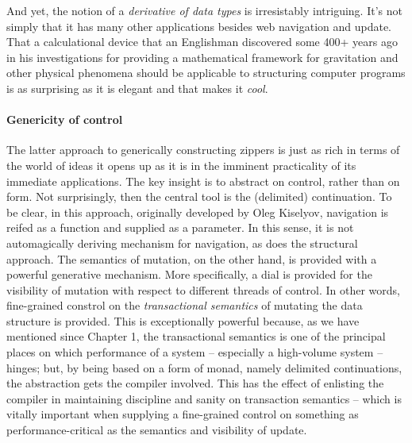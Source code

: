 And yet, the notion of a \emph{derivative of data types} is
irresistably intriguing. It's not simply that it has many other
applications besides web navigation and update. That a calculational
device that an Englishman discovered some 400+ years ago in his
investigations for providing a mathematical framework for gravitation
and other physical phenomena should be applicable to structuring
computer programs is as surprising as it is elegant and that makes it
\emph{cool}.

\paragraph{Genericity of control}

The latter approach to generically constructing zippers is just as
rich in terms of the world of ideas it opens up as it is in the
imminent practicality of its immediate applications. The key insight
is to abstract on control, rather than on form. Not surprisingly, then
the central tool is the (delimited) continuation. To be clear, in
this approach, originally developed by Oleg Kiselyov, navigation is
reifed as a function and supplied as a parameter. In this sense, it is
not automagically deriving mechanism for navigation, as does the
structural approach. The semantics of mutation, on the other hand, is
provided with a powerful generative mechanism. More specifically, a
dial is provided for the visibility of mutation with respect to
different threads of control. In other words, fine-grained constrol on
the \emph{transactional semantics} of mutating the data structure is
provided. This is exceptionally powerful because, as we have mentioned
since Chapter 1, the transactional semantics is one of the principal
places on which performance of a system -- especially a high-volume
system -- hinges; but, by being based on a form of monad, namely
delimited continuations, the abstraction gets the compiler
involved. This has the effect of enlisting the compiler in maintaining
discipline and sanity on transaction semantics -- which is vitally
important when supplying a fine-grained control on something as
performance-critical as the semantics and visibility of update.
